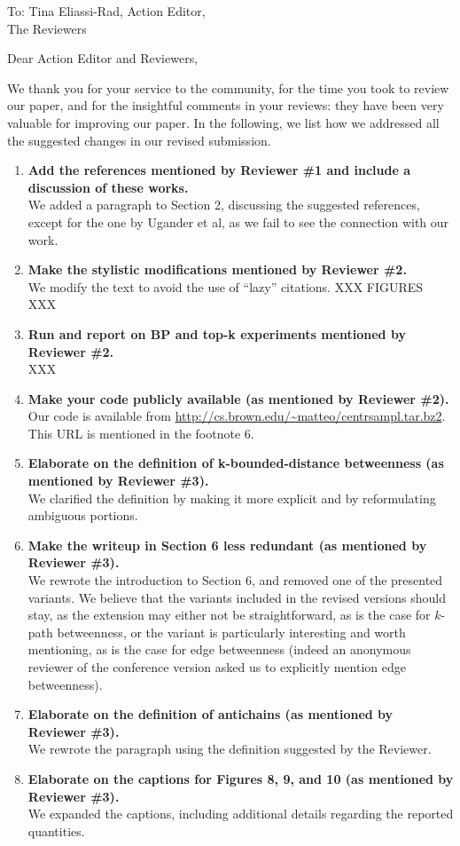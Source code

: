 \documentclass{letter}
\begin{document}
\begin{letter}{To: Tina Eliassi-Rad, Action Editor,\\%
	\qquad The Reviewers}
\opening{Dear Action Editor and Reviewers,}
We thank you for your service to the community, for the time you took to review
our paper, and for the insightful comments in your reviews: they have been very
valuable for improving our paper. In the following, we list how we addressed all
the suggested changes in our revised submission. 

\begin{enumerate}
	\item {\bf Add the references mentioned by Reviewer \#1 and include a discussion
		of these works.}\\
		We added a paragraph to Section 2, discussing the suggested references,
		except for the one by Ugander et al, as we fail to see the connection
		with our work.
	\item {\bf Make the stylistic modifications mentioned by Reviewer \#2.}\\
		We modify the text to avoid the use of ``lazy'' citations.
		XXX FIGURES XXX
	\item {\bf Run and report on BP and top-k experiments mentioned by Reviewer
		\#2.} \\
		XXX
	\item {\bf Make your code publicly available (as mentioned by Reviewer
		\#2).}\\
		Our code is available from
		\url{http://cs.brown.edu/~matteo/centrsampl.tar.bz2}. This URL is
		mentioned in the footnote 6.
	\item {\bf Elaborate on the definition of k-bounded-distance betweenness (as
		mentioned by Reviewer \#3).}\\
		We clarified the definition by making it more explicit and by
		reformulating ambiguous portions.
	\item {\bf Make the writeup in Section 6 less redundant (as mentioned by Reviewer
		\#3).}\\
		We rewrote the introduction to Section 6, and removed one of the
		presented variants. We believe that the variants included in the revised
		versions should stay, as the extension may either not be
		straightforward, as is the case for $k$-path betweenness, or the variant
		is particularly interesting and worth mentioning, as is the case for
		edge betweenness (indeed an anonymous reviewer of the conference version
		asked us to explicitly mention edge betweenness).
	\item {\bf Elaborate on the definition of antichains (as mentioned by Reviewer
		\#3).}\\
		We rewrote the paragraph using the definition suggested by the Reviewer.
	\item {\bf Elaborate on the captions for Figures 8, 9, and 10 (as mentioned by
		Reviewer \#3).}\\
		We expanded the captions, including additional details regarding the
		reported quantities.
\end{enumerate}


\end{letter}
\end{document}
